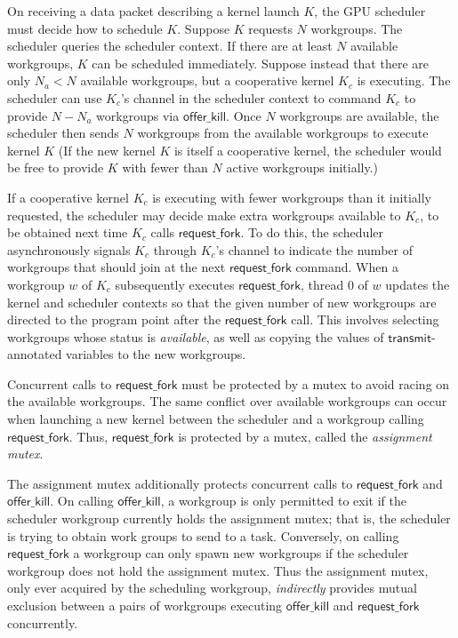 \documentclass[parskip=half,sigconf,review, anonymous=true, acmcopyrightmode=none]{acmart}
\newcommand{\KC}{\mathit{KC}}
\newcommand{\transmit}{\mathsf{transmit}}
\newcommand{\offerfork}{\mathsf{request\_fork}}
\newcommand{\offerkill}{\mathsf{offer\_kill}}
\begin{document}
On receiving a data packet describing a kernel launch $K$, the GPU
scheduler must decide how to schedule $K$. Suppose $K$ requests $N$
workgroups. The scheduler queries the scheduler context.  If there are
at least $N$ available workgroups, $K$ can be scheduled
immediately. Suppose instead that there are only $N_a < N$ available
workgroups, but a cooperative kernel $K_c$ is executing. The scheduler
can use $K_c$'s channel in the scheduler context to command $K_c$ to
provide $N - N_a$ workgroups via $\offerkill$.  Once $N$ workgroups
are available,
the scheduler then sends $N$ workgroups from the available workgroups
to execute kernel $K$
(If the new kernel $K$ is itself a cooperative kernel, the scheduler
would be free to provide $K$ with fewer than $N$ active workgroups
initially.)

If a cooperative kernel $K_c$ is executing with fewer workgroups than
it initially requested, the scheduler may decide make extra workgroups
available to $K_c$, to be obtained next time $K_c$ calls $\offerfork$.
To do this, the scheduler asynchronously signals $K_c$ through $K_c$'s
channel to indicate the number of workgroups that should join at the
next $\offerfork$ command.  When a workgroup $w$ of $K_c$ subsequently
executes $\offerfork$, thread 0 of $w$ updates the kernel and
scheduler contexts so that the given number of new workgroups are
directed to the program point after the $\offerfork$ call.  This
involves selecting workgroups whose status is \emph{available}, as
well as copying the values of $\transmit$-annotated variables to the
new workgroups.

%
Concurrent calls to $\offerfork$ must be protected by a mutex to avoid
racing on the available workgroups. The same conflict over available
workgroups can occur when launching a new kernel between the scheduler
and a workgroup calling $\offerfork$. Thus, $\offerfork$ is protected
by a mutex, called the \emph{assignment mutex}.

The assignment mutex additionally protects concurrent calls to
$\offerfork$ and $\offerkill$.  On calling $\offerkill$, a workgroup
is only permitted to exit if the scheduler workgroup currently holds
the assignment mutex; that is, the scheduler is trying to obtain work
groups to send to a task.  Conversely, on calling $\offerfork$ a
workgroup can only spawn new workgroups if the scheduler workgroup
does not hold the assignment mutex.  Thus the assignment mutex, only
ever acquired by the scheduling workgroup, \emph{indirectly} provides
mutual exclusion between a pairs of workgroups executing $\offerkill$
and $\offerfork$ concurrently.
\end{document}
